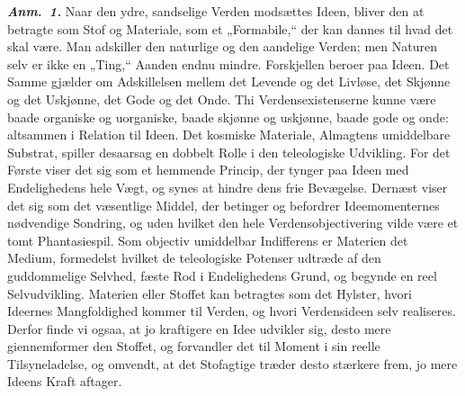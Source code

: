 \documentclass[12pt]{book}
\newcommand{\anm}[1]{\emph{\textbf{Anm.~#1.}}}
\newcommand{\opage}[1]{\marginnote{\footnotesize\textit{[#1]}}}
\begin{document}
\anm{1} Naar den ydre, sandselige Verden modsættes Ideen, bliver den at betragte som Stof
og Materiale, som et „Formabile,“ der kan dannes til hvad det skal være. Man adskiller
den naturlige og den aandelige Verden; men Naturen selv er ikke en „Ting,“ Aanden endnu
mindre. Forskjellen beroer paa Ideen. Det Samme gjælder om Adskillelsen mellem det
Levende og det Livløse, det Skjønne og det Uskjønne, det Gode og det Onde. Thi
Verdensexistenserne kunne være baade organiske og uorganiske, baade skjønne og uskjønne,
baade gode og onde: altsammen i Relation til Ideen. Det kosmiske Materiale, Almagtens
umiddelbare Substrat, spiller desaarsag en dobbelt Rolle i den teleologiske Udvikling.
For det Første viser det sig som et hemmende Princip, der tynger paa Ideen med
Endelighedens hele Vægt, og synes at hindre dens frie Bevægelse. Dernæst viser det sig
som det væsentlige Middel, der betinger og befordrer Ideemomenternes nødvendige Sondring,
og uden hvilket den hele Verdensobjectivering vilde være et tomt Phantasiespil. Som
objectiv umiddelbar Indifferens er Materien det Medium, formedelst hvilket de
teleologiske Potenser udtræde af den guddommelige Selvhed, fæste Rod i Endelighedens
Grund, og begynde en reel Selvudvikling. Materien eller Stoffet kan betragtes som det
Hylster, hvori Ideernes Mangfoldighed kommer til Verden, og hvori Verdensideen selv
realiseres. Derfor finde vi ogsaa, at jo kraftigere en Idee udvikler sig, desto mere
giennemformer den Stoffet, og forvandler det til Moment i sin reelle Tilsyneladelse,
\opage{260} %
og omvendt, at det Stofagtige træder desto stærkere frem, jo mere Ideens Kraft aftager.
\end{document}
